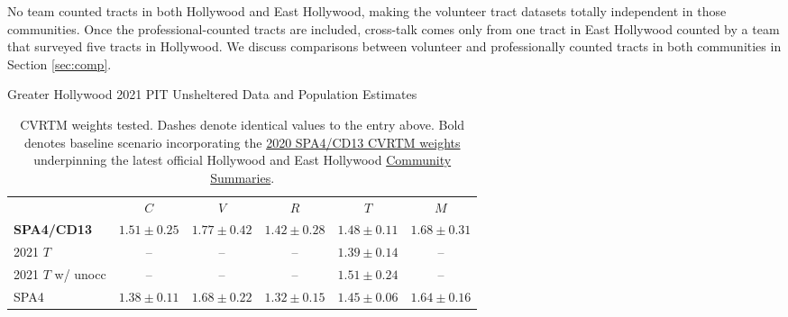 \documentclass[11pt,twocolumn]{article}
\begin{document}
No team counted tracts in both Hollywood and East Hollywood, making the volunteer tract datasets
totally independent in those communities. Once the professional-counted tracts are included, cross-talk
comes only from one tract in East Hollywood counted by a team that surveyed five tracts in Hollywood. 
We discuss comparisons between volunteer and professionally counted tracts in both communities 
in Section \ref{sec:comp}.





\begin{table}[t!]
\centering
\caption{Greater Hollywood 2021 PIT Unsheltered Data and Population Estimates}
\begin{tabular}{lccccc}
\toprule
 & $C$ & $V$ & $R$ & $T$ & $M$ \\ \cmidrule{1-6}
{\bf SPA4/CD13} & $1.51\pm0.25$ & $1.77\pm0.42$ & $1.42\pm0.28$ & $1.48\pm0.11$ & $1.68\pm0.31$ \\
2021 $T$ & -- & -- & -- & $1.39\pm0.14$ & --\\
2021 $T$ w/ unocc & -- & -- & --& $1.51\pm0.24$ & --\\
SPA4 & $1.38\pm0.11$ & $1.68\pm0.22$ & $1.32\pm0.15$ & $1.45\pm0.06$ & $1.64\pm0.16$\\
\bottomrule
\end{tabular}
\caption*{CVRTM weights tested. Dashes denote identical values to the entry above. Bold denotes 
baseline scenario incorporating the 
\href{https://www.lahsa.org/documents?id=4635-usc-2018-2020-multipliers-and-estimates-overview}
{2020 SPA4/CD13 CVRTM weights} underpinning the latest official Hollywood and East Hollywood 
\href{https://www.lahsa.org/documents?id=4686-2020-greater-los-angeles-city-community-homelessness-report-service-planning-area-4.pdf}{Community Summaries}.}
\label{tbl:weights}
\end{table}
\end{document}
